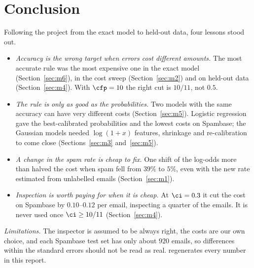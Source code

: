 \section{Conclusion}
\label{sec:conclusion}
Following the project from the exact model to held-out data, four lessons stood out.
\begin{itemize}
  \item \emph{Accuracy is the wrong target when errors cost different amounts.} The most accurate rule
        was the most expensive one in the exact model (Section~\ref{sec:m6}), in the cost sweep
        (Section~\ref{sec:m2}) and on held-out data (Section~\ref{sec:m4}). With $\cfp=10$ the right cut
        is $10/11$, not $0.5$.
  \item \emph{The rule is only as good as the probabilities.} Two models with the same accuracy can
        have very different costs (Section~\ref{sec:m5}). Logistic regression gave the best-calibrated
        probabilities and the lowest costs on Spambase; the Gaussian models needed $\log(1+x)$ features,
        shrinkage and re-calibration to come close (Sections~\ref{sec:m3} and~\ref{sec:m5}).
  \item \emph{A change in the spam rate is cheap to fix.} One shift of the log-odds more than halved
        the cost when spam fell from $39\%$ to $5\%$, even with the new rate estimated from unlabelled
        emails (Section~\ref{sec:m1}).
  \item \emph{Inspection is worth paying for when it is cheap.} At $\ci=0.3$ it cut the cost on
        Spambase by $0.10$--$0.12$ per email, inspecting a quarter of the emails. It is never used once
        $\ci\ge10/11$ (Section~\ref{sec:m4}).
\end{itemize}
\emph{Limitations.} The inspector is assumed to be always right, the costs are our own choice, and
each Spambase test set has only about $920$ emails, so differences within the standard errors should
not be read as real.
 regenerates every number in this report.
